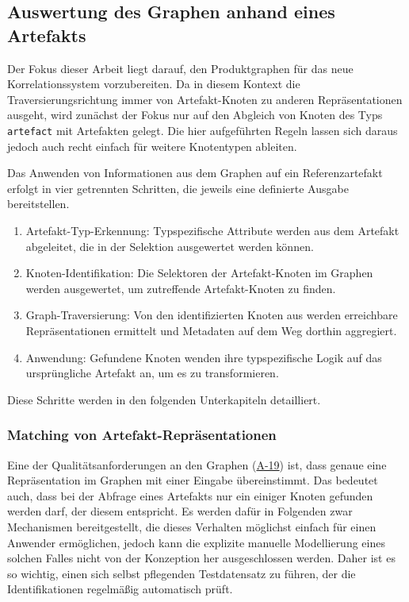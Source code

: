 \subsection{Auswertung des Graphen anhand eines Artefakts}\label{subsec:model-apply-to-artifact}

Der Fokus dieser Arbeit liegt darauf, den Produktgraphen für das neue Korrelationssystem vorzubereiten.
Da in diesem Kontext die Traversierungsrichtung immer von Artefakt-Knoten zu anderen Repräsentationen ausgeht, wird zunächst der Fokus nur auf den Abgleich von Knoten des Typs \texttt{artefact} mit Artefakten gelegt.
Die hier aufgeführten Regeln lassen sich daraus jedoch auch recht einfach für weitere Knotentypen ableiten.

Das Anwenden von Informationen aus dem Graphen auf ein Referenzartefakt erfolgt in vier getrennten Schritten, die jeweils eine definierte Ausgabe bereitstellen.

\begin{enumerate}
    \itemsep0em
    \item Artefakt-Typ-Erkennung: Typspezifische Attribute werden aus dem Artefakt abgeleitet, die in der Selektion ausgewertet werden können.
    \item Knoten-Identifikation: Die Selektoren der Artefakt-Knoten im Graphen werden ausgewertet, um zutreffende Artefakt-Knoten zu finden.
    \item Graph-Traversierung: Von den identifizierten Knoten aus werden erreichbare Repräsentationen ermittelt und Metadaten auf dem Weg dorthin aggregiert.
    \item Anwendung: Gefundene Knoten wenden ihre typspezifische Logik auf das ursprüngliche Artefakt an, um es zu transformieren.
\end{enumerate}

Diese Schritte werden in den folgenden Unterkapiteln detailliert.

\subsubsection{Matching von Artefakt-Repräsentationen}\label{subsubsec:model-matching}

Eine der Qualitätsanforderungen an den Graphen (\hyperref[subsec:req-graph-inner-consistency]{A-19}) ist, dass genaue eine Repräsentation im Graphen mit einer Eingabe übereinstimmt.
Das bedeutet auch, dass bei der Abfrage eines Artefakts nur ein einiger Knoten gefunden werden darf, der diesem entspricht.
Es werden dafür in Folgenden zwar Mechanismen bereitgestellt, die dieses Verhalten möglichst einfach für einen Anwender ermöglichen, jedoch kann die explizite manuelle Modellierung eines solchen Falles nicht von der Konzeption her ausgeschlossen werden.
Daher ist es so wichtig, einen sich selbst pflegenden Testdatensatz zu führen, der die Identifikationen regelmäßig automatisch prüft.

